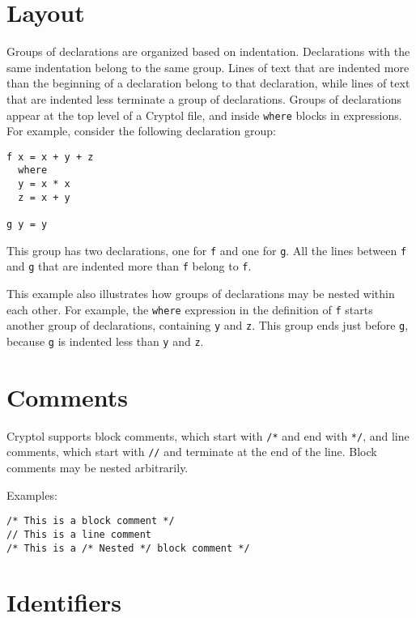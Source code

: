 \section{Layout}\label{layout}

Groups of declarations are organized based on indentation. Declarations
with the same indentation belong to the same group. Lines of text that
are indented more than the beginning of a declaration belong to that
declaration, while lines of text that are indented less terminate a
group of declarations. Groups of declarations appear at the top level of
a Cryptol file, and inside \texttt{where} blocks in expressions. For
example, consider the following declaration group:

\begin{verbatim}
f x = x + y + z
  where
  y = x * x
  z = x + y

g y = y
\end{verbatim}

This group has two declarations, one for \texttt{f} and one for
\texttt{g}. All the lines between \texttt{f} and \texttt{g} that are
indented more than \texttt{f} belong to \texttt{f}.

This example also illustrates how groups of declarations may be nested
within each other. For example, the \texttt{where} expression in the
definition of \texttt{f} starts another group of declarations,
containing \texttt{y} and \texttt{z}. This group ends just before
\texttt{g}, because \texttt{g} is indented less than \texttt{y} and
\texttt{z}.

\section{Comments}\label{comments}

Cryptol supports block comments, which start with \texttt{/*} and end
with \texttt{*/}, and line comments, which start with \texttt{//} and
terminate at the end of the line. Block comments may be nested
arbitrarily.

Examples:

\begin{verbatim}
/* This is a block comment */
// This is a line comment
/* This is a /* Nested */ block comment */
\end{verbatim}

\section{Identifiers}\label{identifiers}

